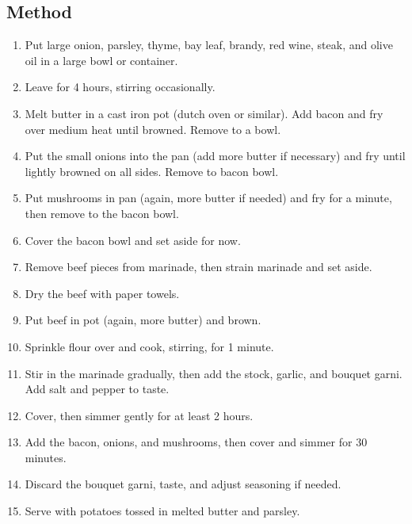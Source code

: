 \begin{multicols}{2}
    \subsection{Method}
      \begin{enumerate}
        \item Put large onion, parsley, thyme, bay leaf, brandy, red wine, steak, and olive oil in a large bowl or container.
        \item Leave for 4 hours, stirring occasionally.
        \item Melt butter in a cast iron pot (dutch oven or similar). Add bacon and fry over medium heat until browned. Remove to a bowl.
        \item Put the small onions into the pan (add more butter if necessary) and fry until lightly browned on all sides. Remove to bacon bowl.
        \item Put mushrooms in pan (again, more butter if needed) and fry for a minute, then remove to the bacon bowl.
        \item Cover the bacon bowl and set aside for now.
        \item Remove beef pieces from marinade, then strain marinade and set aside.
        \item Dry the beef with paper towels.
        \item Put beef in pot (again, more butter) and brown.
        \item Sprinkle flour over and cook, stirring, for 1 minute.
        \item Stir in the marinade gradually, then add the stock, garlic, and bouquet garni. Add salt and pepper to taste.
        \item Cover, then simmer gently for at least 2 hours.
        \item Add the bacon, onions, and mushrooms, then cover and simmer for 30 minutes.
        \item Discard the bouquet garni, taste, and adjust seasoning if needed.
        \item Serve with potatoes tossed in melted butter and parsley.
      \end{enumerate}
    \end{multicols}
